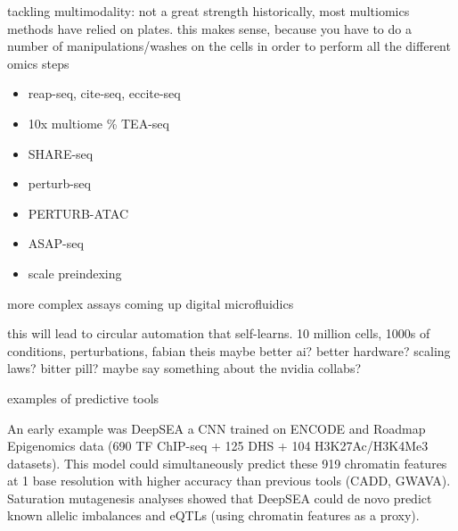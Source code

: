 tackling multimodality: not a great strength
historically, most multiomics methods have relied on plates. this makes sense, because you have to do a number of manipulations/washes on the cells in order to perform all the different omics steps

\begin{itemize}[noitemsep]
    \item reap-seq, cite-seq, eccite-seq
    \item 10x multiome \% TEA-seq
    \item SHARE-seq
    \item perturb-seq
    \item PERTURB-ATAC
    \item ASAP-seq
    \item scale preindexing
\end{itemize}

more complex assays coming up 
digital microfluidics 

this will lead to circular automation that self-learns. 10 million cells, 1000s of conditions, perturbations, fabian theis maybe better ai? better hardware? scaling laws? bitter pill? maybe say something about the nvidia collabs?


examples of predictive tools

An early example was DeepSEA a CNN trained on ENCODE and Roadmap Epigenomics data (690 TF ChIP-seq + 125 DHS + 104 H3K27Ac/H3K4Me3 datasets). This model could simultaneously predict these 919 chromatin features at 1 base resolution with higher accuracy than previous tools (CADD, GWAVA). Saturation mutagenesis analyses showed that DeepSEA could de novo predict known allelic imbalances and eQTLs (using chromatin features as a proxy).


